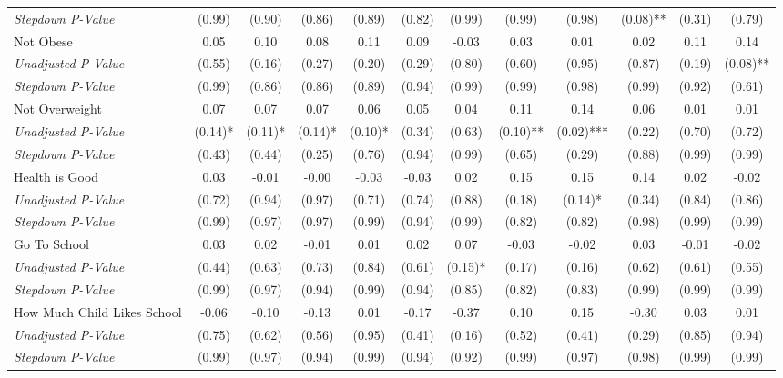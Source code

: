\begin{tabular}{l c c c c c c c c c c c}
\quad \textit{Stepdown P-Value} & (0.99) & (0.90) & (0.86) & (0.89) & (0.82) & (0.99) & (0.99) & (0.98) & (0.08)** & (0.31) & (0.79) \\
Not Obese & 0.05 & 0.10 & 0.08 & 0.11 & 0.09 & -0.03 & 0.03 & 0.01 & 0.02 & 0.11 & 0.14 \\
\quad \textit{Unadjusted P-Value} & (0.55) & (0.16) & (0.27) & (0.20) & (0.29) & (0.80) & (0.60) & (0.95) & (0.87) & (0.19) & (0.08)** \\
\quad \textit{Stepdown P-Value} & (0.99) & (0.86) & (0.86) & (0.89) & (0.94) & (0.99) & (0.99) & (0.98) & (0.99) & (0.92) & (0.61) \\
Not Overweight & 0.07 & 0.07 & 0.07 & 0.06 & 0.05 & 0.04 & 0.11 & 0.14 & 0.06 & 0.01 & 0.01 \\
\quad \textit{Unadjusted P-Value} & (0.14)* & (0.11)* & (0.14)* & (0.10)* & (0.34) & (0.63) & (0.10)** & (0.02)*** & (0.22) & (0.70) & (0.72) \\
\quad \textit{Stepdown P-Value} & (0.43) & (0.44) & (0.25) & (0.76) & (0.94) & (0.99) & (0.65) & (0.29) & (0.88) & (0.99) & (0.99) \\
Health is Good & 0.03 & -0.01 & -0.00 & -0.03 & -0.03 & 0.02 & 0.15 & 0.15 & 0.14 & 0.02 & -0.02 \\
\quad \textit{Unadjusted P-Value} & (0.72) & (0.94) & (0.97) & (0.71) & (0.74) & (0.88) & (0.18) & (0.14)* & (0.34) & (0.84) & (0.86) \\
\quad \textit{Stepdown P-Value} & (0.99) & (0.97) & (0.97) & (0.99) & (0.94) & (0.99) & (0.82) & (0.82) & (0.98) & (0.99) & (0.99) \\
Go To School & 0.03 & 0.02 & -0.01 & 0.01 & 0.02 & 0.07 & -0.03 & -0.02 & 0.03 & -0.01 & -0.02 \\
\quad \textit{Unadjusted P-Value} & (0.44) & (0.63) & (0.73) & (0.84) & (0.61) & (0.15)* & (0.17) & (0.16) & (0.62) & (0.61) & (0.55) \\
\quad \textit{Stepdown P-Value} & (0.99) & (0.97) & (0.94) & (0.99) & (0.94) & (0.85) & (0.82) & (0.83) & (0.99) & (0.99) & (0.99) \\
How Much Child Likes School & -0.06 & -0.10 & -0.13 & 0.01 & -0.17 & -0.37 & 0.10 & 0.15 & -0.30 & 0.03 & 0.01 \\
\quad \textit{Unadjusted P-Value} & (0.75) & (0.62) & (0.56) & (0.95) & (0.41) & (0.16) & (0.52) & (0.41) & (0.29) & (0.85) & (0.94) \\
\quad \textit{Stepdown P-Value} & (0.99) & (0.97) & (0.94) & (0.99) & (0.94) & (0.92) & (0.99) & (0.97) & (0.98) & (0.99) & (0.99) \\

\end{tabular}
